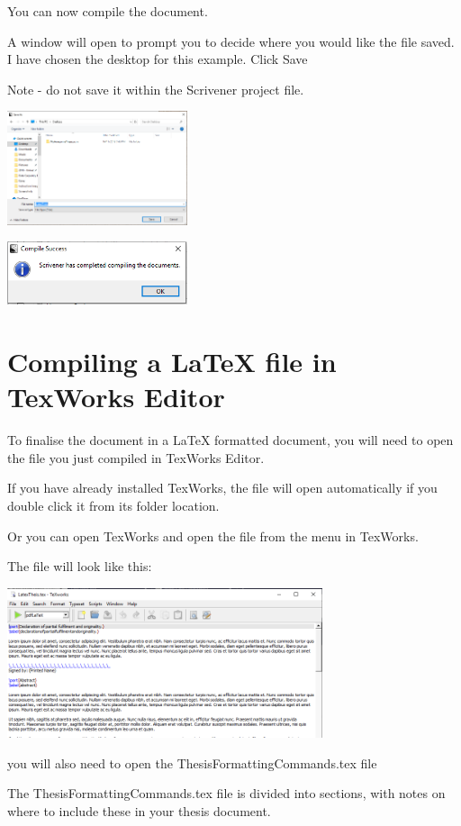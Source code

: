 \documentclass{article}
\begin{document}
You can now compile the document.

A window will open to prompt you to decide where you would like the file saved. I have chosen the desktop for this example. Click Save

Note - do not save it within the Scrivener project file. 

\includegraphics[width=200px]{images/scriv017.PNG}

\includegraphics[width=200px]{images/scriv018.PNG}


\section{Compiling a LaTeX file in TexWorks Editor}

To finalise the document in a LaTeX formatted document, you will need to open the file you just compiled in TexWorks Editor. 

If you have already installed TexWorks, the file will open automatically if you double click it from its folder location.

Or you can open TexWorks and open the file from the menu in TexWorks.

The file will look like this:

\includegraphics[width=350px]{images/tex001.PNG}

you will also need to open the ThesisFormattingCommands.tex file 

The ThesisFormattingCommands.tex file is divided into sections, with notes on where to include these in your thesis document.
\end{document}
